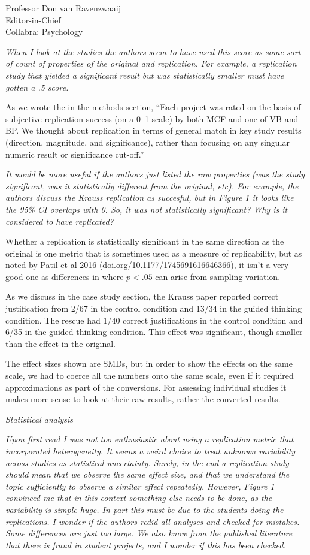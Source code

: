 \documentclass{stanfordletter}
\newcommand{\theysaid}[1]{\begin{leftbar} \noindent 
		\textsl{ #1}\end{leftbar}}
\begin{document}
\begin{letter}{Professor Don van Ravenzwaaij \\ Editor-in-Chief \\ Collabra: Psychology }
		\theysaid{ When I look at the studies the authors seem to have used this score as some sort of count of properties of the original and replication. For example, a replication study that yielded a significant result but was statistically smaller must have gotten a .5 score. }
		
		As we wrote the in the methods section, ``Each project was rated on the basis of subjective replication success (on a 0--1 scale) by both MCF and one of VB and BP.
		We thought about replication in terms of general match in key study results (direction, magnitude, and significance), rather than focusing on any singular numeric result or significance cut-off.''
 
		
		\theysaid{
		It would be more useful if the authors just listed the raw properties (was the study significant, was it statistically different from the original, etc). For example, the authors discuss the Krauss replication as succesful, but in Figure 1 it looks like the 95\% CI overlaps with 0. So, it was not statistically significant? Why is it considered to have replicated?}
		
		Whether a replication is statistically significant in the same direction as the original is one metric that is sometimes used as a measure of replicability, but as noted by Patil et al 2016 (doi.org/10.1177/1745691616646366), it isn't a very good one as differences in where $p<.05$ can arise from sampling variation. 
		
		As we discuss in the case study section, the Krauss paper reported correct justification from 2/67 in the control condition and 13/34 in the guided thinking condition.  The rescue had 1/40  correct justifications in the control condition and 6/35 in the guided thinking condition. This effect was significant, though smaller than the effect in the original. 
		
		The effect sizes shown are SMDs, but in order to show the effects on the same scale, we had to coerce all the numbers onto the same scale, even if it required approximations as part of the conversions. For assessing individual studies it makes more sense to look at their raw results, rather the converted results. 
		
		\theysaid{Statistical analysis}
		\theysaid{Upon first read I was not too enthusiastic about using a replication metric that incorporated heterogeneity. It seems a weird choice to treat unknown variability across studies as statistical uncertainty. Surely, in the end a replication study should mean that we observe the same effect size, and that we understand the topic sufficiently to observe a similar effect repeatedly. However, Figure 1 convinced me that in this context something else needs to be done, as the variability is simple huge. In part this must be due to the students doing the replications. I wonder if the authors redid all analyses and checked for mistakes. Some differences are just too large. We also know from the published literature that there is fraud in student projects, and I wonder if this has been checked.}
		

\end{letter}
\end{document}
